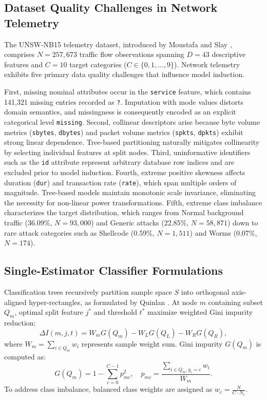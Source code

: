 \documentclass[10pt,conference,compsoc]{IEEEtran}
\begin{document}
\subsection{Dataset Quality Challenges in Network Telemetry}
The UNSW-NB15 telemetry dataset, introduced by Moustafa and Slay \cite{moustafa2015}, comprises $N = 257,673$ traffic flow observations spanning $D = 43$ descriptive features and $C = 10$ target categories ($C \in \{0, 1, \dots, 9\}$). Network telemetry exhibits five primary data quality challenges that influence model induction.

First, missing nominal attributes occur in the \texttt{service} feature, which contains 141,321 missing entries recorded as \texttt{?}. Imputation with mode values distorts domain semantics, and missingness is consequently encoded as an explicit categorical level \texttt{missing}. Second, collinear descriptors arise because byte volume metrics (\texttt{sbytes}, \texttt{dbytes}) and packet volume metrics (\texttt{spkts}, \texttt{dpkts}) exhibit strong linear dependence. Tree-based partitioning naturally mitigates collinearity by selecting individual features at split nodes. Third, uninformative identifiers such as the \texttt{id} attribute represent arbitrary database row indices and are excluded prior to model induction. Fourth, extreme positive skewness affects duration (\texttt{dur}) and transaction rate (\texttt{rate}), which span multiple orders of magnitude. Tree-based models maintain monotonic scale invariance, eliminating the necessity for non-linear power transformations. Fifth, extreme class imbalance characterizes the target distribution, which ranges from Normal background traffic (36.09\%, $N=93,000$) and Generic attacks (22.85\%, $N=58,871$) down to rare attack categories such as Shellcode (0.59\%, $N=1,511$) and Worms (0.07\%, $N=174$).

\subsection{Single-Estimator Classifier Formulations}
Classification trees recursively partition sample space $S$ into orthogonal axis-aligned hyper-rectangles, as formulated by Quinlan \cite{quinlan1986}. At node $m$ containing subset $Q_m$, optimal split feature $j^*$ and threshold $t^*$ maximize weighted Gini impurity reduction:
\begin{equation}
\Delta I(m, j, t) = W_m G(Q_m) - W_L G(Q_L) - W_R G(Q_R),
\end{equation}
where $W_m = \sum_{i \in Q_m} w_i$ represents sample weight sum. Gini impurity $G(Q_m)$ is computed as:
\begin{equation}
G(Q_m) = 1 - \sum_{c=0}^{C-1} p_{mc}^2, \quad p_{mc} = \frac{\sum_{i \in Q_m, y_i=c} w_i}{W_m}.
\end{equation}
To address class imbalance, balanced class weights are assigned as $w_c = \frac{N}{C \cdot N_c}$.
\end{document}
